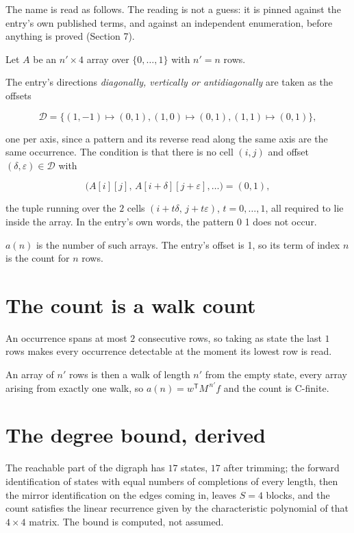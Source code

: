 \documentclass[11pt]{article}
\theoremstyle{definition}
\begin{document}
The name is read as follows. The reading is not a guess: it is pinned against the entry's own published terms, and against an independent enumeration, before anything is proved (Section 7).

Let $A$ be an $n' \times 4$ array over $\{0,\dots,1\}$ with $n' = n$ rows.

The entry's directions {\itshape diagonally, vertically or antidiagonally} are taken as the offsets

\[\mathcal{D} = \{(1,-1)\mapsto(0,1), (1,0)\mapsto(0,1), (1,1)\mapsto(0,1)\},\]

one per axis, since a pattern and its reverse read along the same axis are the same occurrence. The condition is that there is no cell $(i,j)$ and offset $(\delta,\varepsilon)\in\mathcal{D}$ with

\[\bigl(A[i][j],\,A[i{+}\delta][j{+}\varepsilon],\dots\bigr) = (0, 1),\]

the tuple running over the $2$ cells $(i+t\delta,\,j+t\varepsilon)$, $t = 0,\dots,1$, all required to lie inside the array. In the entry's own words, the pattern 0 1 does not occur.

$a(n)$ is the number of such arrays. The entry's offset is 1, so its term of index $n$ is the count for $n$ rows.

\section{The count is a walk count}

An occurrence spans at most $2$ consecutive rows, so taking as state the last $1$ rows makes every occurrence detectable at the moment its lowest row is read.

An array of $n'$ rows is then a walk of length $n'$ from the empty state, every array arising from exactly one walk, so $a(n) = w^{\mathsf T}M^{\,n'}f$ and the count is C-finite.

\section{The degree bound, derived}

The reachable part of the digraph has $17$ states, $17$ after trimming; the forward identification of states with equal numbers of completions of every length, then the mirror identification on the edges coming in, leaves $S = 4$ blocks, and the count satisfies the linear recurrence given by the characteristic polynomial of that $4\times4$ matrix. The bound is computed, not assumed.
\end{document}
